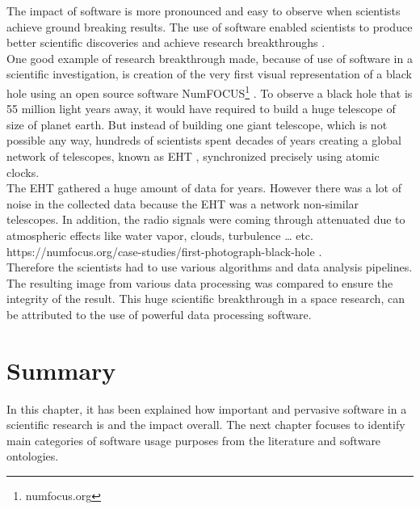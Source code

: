 The impact of software is more pronounced and easy to observe when scientists achieve ground breaking results. The use of software enabled scientists to produce better scientific discoveries and achieve research breakthroughs \citep{goble2014better}. \\

One good example of research breakthrough made, because of use of software in a scientific investigation,  is creation of the very first visual representation of a black hole using an open source software  NumFOCUS\footnote{numfocus.org} \citep{event2019first}. To observe a black hole that is 55 million light years away, it would have required to build a huge telescope of size of planet earth. But instead of building one giant telescope, which is not possible any way, hundreds of scientists spent decades of years creating a global network of telescopes, known as  \ac{EHT} \citep{enwiki:1052167868}, synchronized precisely using atomic clocks. \\

The \ac{EHT} gathered a huge amount of data for years. However there was a lot of noise in the collected data because the \ac{EHT} was a network  non-similar telescopes. In addition, the radio signals were coming through attenuated due to atmospheric effects like water vapor, clouds, turbulence … etc. { https://numfocus.org/case-studies/first-photograph-black-hole }.\\

Therefore the scientists had to use various algorithms and data analysis pipelines. The resulting image from various data processing was compared to ensure the integrity of the result. This huge scientific breakthrough in a space research, can be attributed to the use of powerful data processing software. 

\section{Summary}
\label{sec:Roles:Summary}

In this chapter, it has been explained how important and pervasive software in a scientific research is and the impact overall. The next chapter focuses to identify main categories of software usage purposes from the literature and  software ontologies.  




